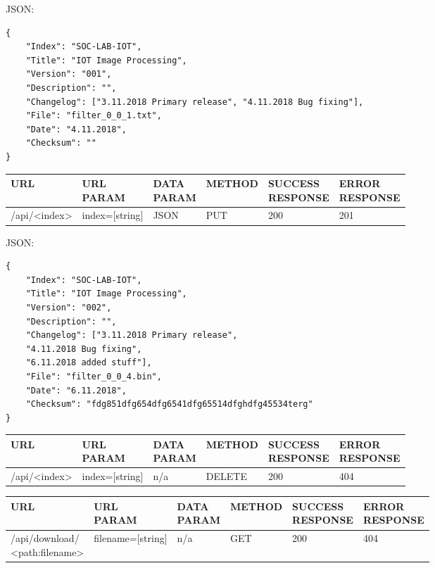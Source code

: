 JSON:
\begin{verbatim}
{
    "Index": "SOC-LAB-IOT",
    "Title": "IOT Image Processing",
    "Version": "001",
    "Description": "",
    "Changelog": ["3.11.2018 Primary release", "4.11.2018 Bug fixing"],
    "File": "filter_0_0_1.txt",
    "Date": "4.11.2018",
    "Checksum": ""
}	    
\end{verbatim}

\begin{table}[htbp]
    \begin{tabular}[h]{llllll}
    URL          & \specialcell{URL\\PARAM}     & \specialcell{DATA\\PARAM}  & METHOD &  \specialcell{SUCCESS\\RESPONSE} & \specialcell{ERROR\\RESPONSE} \\ \hline
    /api/<index> & index=[string] & JSON  & PUT    & 200              & 201            \\ 
    \end{tabular}
\end{table}

JSON:
\begin{verbatim}
{
    "Index": "SOC-LAB-IOT",
    "Title": "IOT Image Processing",
    "Version": "002",
    "Description": "",
    "Changelog": ["3.11.2018 Primary release", 
    "4.11.2018 Bug fixing", 
    "6.11.2018 added stuff"],
    "File": "filter_0_0_4.bin",
    "Date": "6.11.2018",
    "Checksum": "fdg851dfg654dfg6541dfg65514dfghdfg45534terg"
}	
\end{verbatim}

\begin{tabular}[h]{llllll}
URL          & \specialcell{URL\\PARAM}     & \specialcell{DATA\\PARAM}  & METHOD &  \specialcell{SUCCESS\\RESPONSE} & \specialcell{ERROR\\RESPONSE} \\ \hline
/api/<index> & index=[string] & n/a        & DELETE & 200              & 404            \\ 
\end{tabular}

\begin{tabular}[h]{llllll}
URL          & \specialcell{URL\\PARAM}     & \specialcell{DATA\\PARAM}  & METHOD &  \specialcell{SUCCESS\\RESPONSE} & \specialcell{ERROR\\RESPONSE} \\ \hline
\specialcell{/api/download/\\<path:filename>} &  filename=[string] & n/a        & GET    & 200              & 404            \\ 
\end{tabular}
